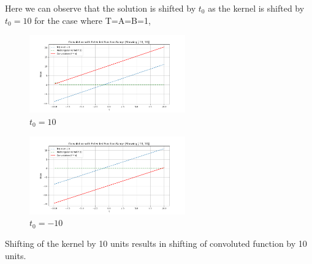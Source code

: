 Here we can observe that the solution is shifted by 
$t_0$ as the kernel is shifted by $t_0=10$ for the case where T=A=B=1,
\begin{figure}[h]
    \centering
    \includegraphics[width=0.6\textwidth]{figsm/5.png}
    \caption{$t_0 = 10$}
    \label{fig:conv_sinc}
\end{figure}
\begin{figure}[h]
    \centering
    \includegraphics[width=0.6\textwidth]{figsm/6.png}
    \caption{$t_0 = -10$}
    \label{fig:conv_sinc}
\end{figure}
Shifting of the kernel by 10 units results in shifting of convoluted function by 10 units.